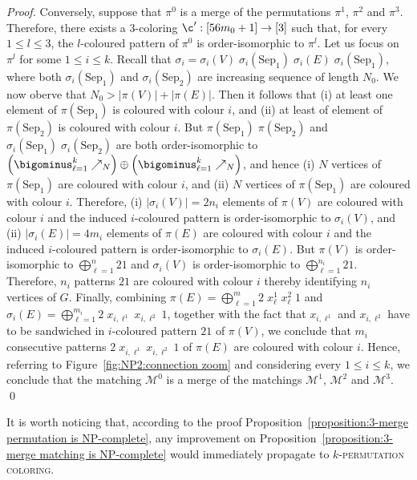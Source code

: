 \begin{proof}
  Conversely, suppose that 
  $\pi^0$ is a merge of the permutations $\pi^1$, $\pi^2$ and $\pi^3$.
  Therefore, there exists a $3$-coloring $\c': [56m_0 + 1] \to [3]$
  such that, for every $1 \leq l \leq 3$,
  the $l$-coloured pattern of $\pi^0$ is order-isomorphic to $\pi^l$.
  Let us focus on $\pi^l$ for some $1 \leq i \leq k$.
  Recall that
  $\sigma_i =
  \sigma_i(V)   \;
  \sigma_i\left(\text{Sep}_1\right) \;
  \sigma_i\left(E\right)   \;
  \sigma_i\left(\text{Sep}_1\right)$,
  where both
  $\sigma_i\left(\text{Sep}_1\right)$ and $\sigma_i\left(\text{Sep}_2\right)$
  are increasing sequence of length $N_0$.
  We now oberve that
  $N_0 > |\pi(V)| + |\pi(E)|$.
  Then it follows that
  (i) at least one element of $\pi(\text{Sep}_1)$ is coloured with
  colour $i$,
  and
  (ii) at least of element of $\pi(\text{Sep}_2)$ is coloured with
  colour $i$.
  But
  $\pi(\text{Sep}_1) \; \pi(\text{Sep}_2)$ and
  $\sigma_i\left(\text{Sep}_1\right) \; \sigma_i\left(\text{Sep}_2\right)$
  are both order-isomorphic to
  $\left(\bigominus_{\ell=1}^{k} \nearrow_N\right) \oplus \left(\bigominus_{\ell=1}^{k} \nearrow_N\right)$,
  and hence
  (i) $N$ vertices of $\pi(\text{Sep}_1)$ are coloured with
  colour $i$,
  and
  (ii) $N$ vertices of $\pi(\text{Sep}_1)$ are coloured with
  colour $i$.
  Therefore,
  (i) $|\sigma_i(V)| = 2n_i$ elements of
  $\pi(V)$ are coloured with colour $i$ and the induced
  $i$-coloured pattern is order-isomorphic to $\sigma_i(V)$,
  and
  (ii) $|\sigma_i\left(E\right)| = 4m_i$ elements of
  $\pi(E)$ are coloured with colour $i$ and the induced
  $i$-coloured pattern is order-isomorphic to $\sigma_i\left(E\right)$.
  But $\pi(V)$ is order-isomorphic to $\bigoplus_{\ell=1}^{n} 21$
  and
  $\sigma_i(V)$ is order-isomorphic to $\bigoplus_{\ell=1}^{n_i} 21$.
  Therefore, $n_i$ patterns $21$ are coloured with colour $i$ thereby identifying
  $n_i$ vertices of $G$.
  Finally,
  combining
  $\pi(E) = \bigoplus_{\ell=1}^{m} 2 \; x_\ell^1 \; x_\ell^2 \; 1$ and
  $\sigma_i\left(E\right) = \bigoplus_{\ell=1}^{m_i} 2 \; x_{i,\ell^1} \; x_{i,\ell^2} \; 1$,
  together with the fact that $x_{i,\ell^1}$ and $x_{i,\ell^2}$ have to be sandwiched in
  $i$-coloured pattern $21$ of $\pi(V)$,
  we conclude that $m_i$ consecutive patterns $2 \; x_{i,\ell^1} \; x_{i,\ell^2} \; 1$
  of $\pi(E)$ are coloured with colour $i$.
  Hence, referring to
  Figure~\ref{fig:NP2:connection zoom} and considering every $1 \leq i \leq k$,
  we conclude that the matching $\mathcal{M}^0$ is a merge 
  of the matchings $\mathcal{M}^1$, $\mathcal{M}^2$ and $\mathcal{M}^3$.
  \qed
\end{proof}

It is worth noticing that, according to the proof
Proposition~\ref{proposition:3-merge permutation is NP-complete},
any improvement on Proposition~\ref{proposition:3-merge matching is NP-complete}
would immediately propagate to \textsc{$k$-permutation coloring}.
